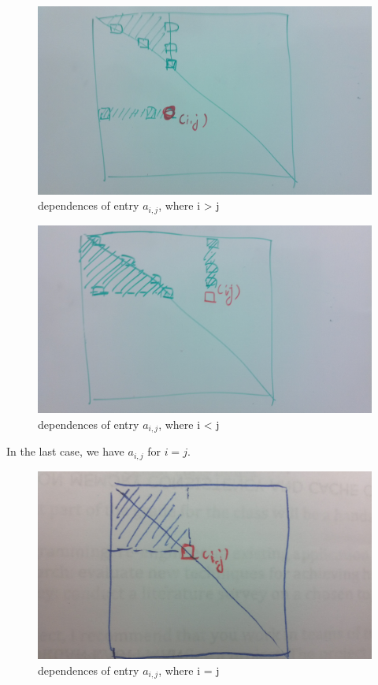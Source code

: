 \begin{figure} [H]
\includegraphics[width=\textwidth]{figures/a1.jpg}
\caption{dependences of entry $a_{i,j}$, where i > j}
\end{figure}

\begin{figure} [H]
\includegraphics[width=\textwidth]{figures/a2.jpg}
\caption{dependences of entry $a_{i,j}$, where i < j}
\end{figure}

In the last case, we have $a_{i,j}$ for $i = j$. 
\begin{figure} [H]
\includegraphics[width=\textwidth]{figures/a3.jpg}
\caption{dependences of entry $a_{i,j}$, where i = j}
\end{figure}

